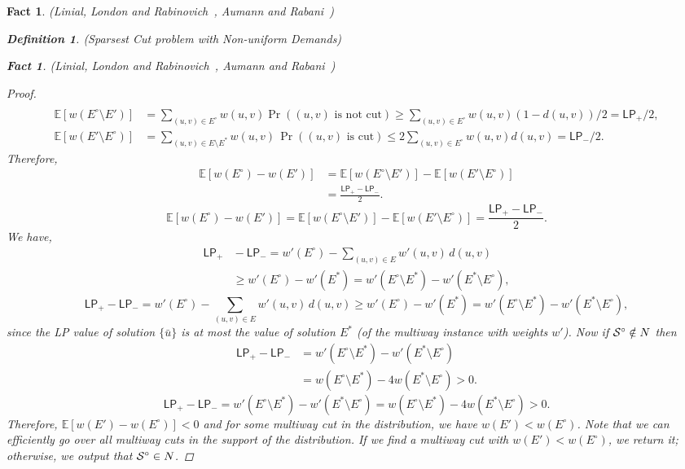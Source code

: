 \documentclass[twoside,leqno,twocolumn]{article}
\newcommand {\Exp}       {\mathbb{E}}
\newcommand {\E}     [1] {\Exp\left[#1\right]}
\newtheorem{Definition}[theorem]{Definition}
\newtheorem{fact}[theorem]{Fact}
\begin{document}
\begin{fact}{\sc (Linial, London and Rabinovich~\cite{LLR}, Aumann and Rabani~\cite{AR})}
\begin{Definition} {\sc (Sparsest Cut problem with Non-uniform Demands)}
\begin{fact}{\sc (Linial, London and Rabinovich~\cite{LLR}, Aumann and Rabani~\cite{AR})}
\begin{proof}
\begin{align*}
\end{align*}
\else
\begin{align*}
\E{w(E^{\circ}\setminus E')} &= \sum_{(u,v) \in E^{\circ}} w(u,v) \Pr((u,v) \text{ is not cut}) \geq 
\sum_{(u,v) \in E^{\circ}} w(u,v) (1-d(u,v))/2 = \mathsf{LP}_{+}/2,\\
\E{w(E'\setminus E^{\circ})} &= \sum_{(u,v) \in E\setminus E^*} w(u,v) \, \Pr((u, v) \text{ is cut}) \leq 
2\sum_{(u,v) \in E^{\circ}} w(u,v) d(u,v) = \mathsf{LP}_{-}/2.
\end{align*}
\fi
Therefore, 
\ifSODA
\begin{align*}
\E{w(E^{\circ})- w(E')} &=  \E{w(E^{\circ}\setminus E')} - \E{w(E'\setminus E^{\circ})}\\
&= \frac{\mathsf{LP}_{+}- \mathsf{LP}_{-}}{2}.
\end{align*}
\else
$$\E{w(E^{\circ})- w(E')} =  \E{w(E^{\circ}\setminus E')} - \E{w(E'\setminus E^{\circ})}= \frac{\mathsf{LP}_{+}- \mathsf{LP}_{-}}{2}.$$
\fi
We have,
\ifSODA
\begin{align*}
\mathsf{LP}_{+} &{}- \mathsf{LP}_{-} = w'(E^{\circ}) - \sum_{(u,v) \in E} w'(u,v) \, d(u,v) \\
&\geq w'(E^{\circ}) - w'(E^*)  = w'(E^{\circ} \setminus E^*) - w'(E^* \setminus E^{\circ}),
\end{align*}
\else
$$\mathsf{LP}_{+} - \mathsf{LP}_{-} = w'(E^{\circ}) - \sum_{(u,v) \in E} w'(u,v) \, d(u,v) \geq w'(E^{\circ}) - w'(E^*) 
= w'(E^{\circ} \setminus E^*) - w'(E^* \setminus E^{\circ}),$$
\fi
since the LP value of solution $\{\bar u\}$ is at most the value of solution $E^*$ (of the multiway instance with weights $w'$).
Now if ${\cal S}^{\circ}\notin N$ then
\ifSODA
\begin{align*}
\mathsf{LP}_{+} - \mathsf{LP}_{-} &= w'(E^{\circ} \setminus E^*) - w'(E^* \setminus E^{\circ})\\
& = w(E^{\circ} \setminus E^*) - 4 w(E^* \setminus E^{\circ}) > 0.
\end{align*}
\else
$$\mathsf{LP}_{+} - \mathsf{LP}_{-} = w'(E^{\circ} \setminus E^*) - w'(E^* \setminus E^{\circ})
 = w(E^{\circ} \setminus E^*) - 4 w(E^* \setminus E^{\circ}) > 0.
$$
\fi
Therefore, $\E{w(E')-w(E^{\circ})} < 0$ and for some multiway cut in the distribution, we have 
$w(E')<w(E^{\circ})$. Note that we can efficiently go over all multiway cuts in the support of the
distribution. If we find a multiway cut with $w(E') < w(E^{\circ})$, we return it; otherwise, 
we output that ${\cal S}^{\circ}\in N$.
\end{proof}


\end{fact}
\end{Definition}
\end{fact}
\end{document}
